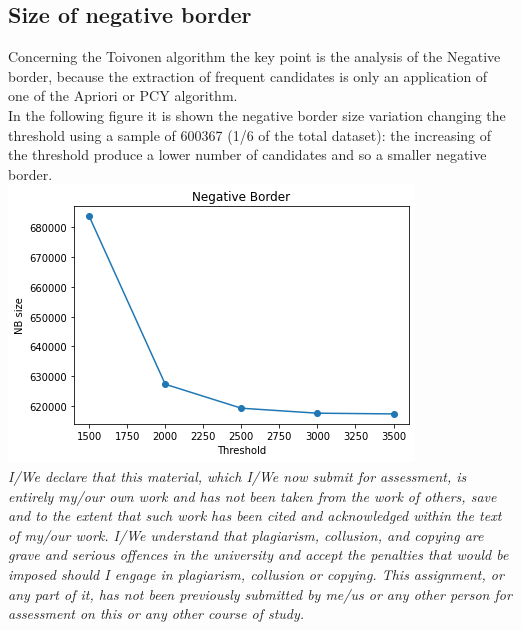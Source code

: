 \documentclass[14pt]{extarticle}
\begin{document}
\subsection{Size of negative border}
Concerning the Toivonen algorithm the key point is the analysis of the Negative border, because the extraction of frequent candidates is only an application of one of the Apriori or PCY algorithm.\\
In the following figure it is shown the negative border size variation changing the threshold using a sample of 600367 (1/6 of the total dataset): the increasing of the threshold produce a lower number of candidates and so a smaller negative border.\\
\includegraphics[scale=1]{nb_sizes.png}\\
\newpage
{\it I/We declare that this material, which I/We now submit for assessment, is entirely my/our own work and has not been taken from the work of others, save and to the extent that such work has been cited and acknowledged within the text of my/our work. I/We understand that plagiarism, collusion, and copying are grave and serious offences in the university and accept the penalties that would be imposed should I engage in plagiarism, collusion or copying. This assignment, or any part of it, has not been previously submitted by me/us or any other person for assessment on this or any other course of study.}

\end{document}
